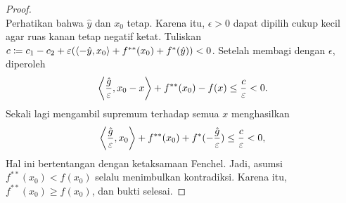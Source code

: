 \begin{proof}
\begin{equation}
    \end{equation}
    Perhatikan bahwa $\hat y$ dan $x_0$ tetap. Karena itu, $\epsilon>0$ dapat dipilih cukup kecil agar ruas kanan tetap negatif ketat. Tuliskan $c \coloneq c_1-c_2 + \varepsilon( \left\langle-\hat y , x_0\right\rangle + f^{**}(x_0)+f^*(\hat y))<0$. Setelah membagi dengan $\epsilon$, diperoleh
    \begin{equation}
        \begin{aligned}
            \left\langle\frac{\hat g}{\varepsilon} , x_0-x\right\rangle + f^{**}(x_0)-f(x)
            \leq \frac{c}{\varepsilon}<0.
        \end{aligned}
    \end{equation}
    Sekali lagi mengambil supremum terhadap semua $x$ menghasilkan
    \begin{equation}
        \begin{aligned}
            \left\langle\frac{\hat g}{\varepsilon} , x_0\right\rangle + f^{**}(x_0)+f^*(-\frac{\hat g}{\varepsilon})
            \leq \frac{c}{\varepsilon}<0,
        \end{aligned}
    \end{equation}
    Hal ini bertentangan dengan ketaksamaan Fenchel. Jadi, asumsi $f^{**}(x_0)<f(x_0)$ selalu menimbulkan kontradiksi. Karena itu, $f^{**}(x_0)\geq f(x_0)$, dan bukti selesai.
\end{proof}


